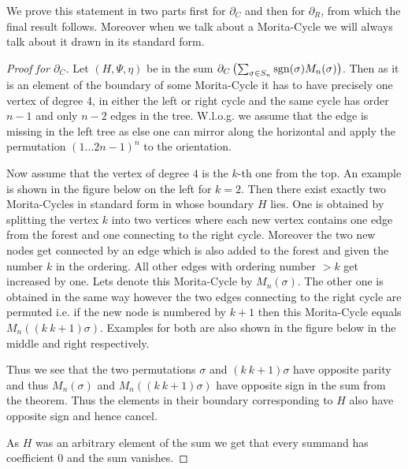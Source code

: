 We prove this statement in two parts first for $\partial_{C}$ and then for $\partial_{R}$, from which the final result follows.
Moreover when we talk about a Morita-Cycle we will always talk about it drawn in its standard form.
\begin{proof}[Proof for $\partial_C$]
	Let $(H,\Psi,\eta)$ be in the sum $\partial_{C}\left(\sum_{\sigma \in S_{n}} \operatorname{sgn}(\sigma) M_{n}(\sigma)\right)$.
	Then as it is an element of the boundary of some Morita-Cycle it has to
	have precisely one vertex of degree 4, in either the left or right cycle and the same cycle has order $n-1$ and only $n-2$ edges in the tree.
	W.l.o.g. we assume that the edge is missing in the left tree as else one can mirror along the horizontal
	and apply the permutation $(1 \ldots 2n-1)^{n}$ to the orientation.

	Now assume that the vertex of degree $4$ is the $k$-th one from the top. An example is shown in the figure below on the left for $k = 2$.
	Then there exist exactly two Morita-Cycles in standard form in whose boundary $H$ lies. 
	One is obtained by splitting the vertex $k$ into two vertices where each new vertex contains one edge from the forest and one connecting to the right cycle.
	Moreover the two new nodes get connected by an edge which is also added to the forest and given the number $k$ in the ordering.
	All other edges with ordering number  $> k $ get increased by one. Lets denote this Morita-Cycle by $M_{n}(\sigma)$.
	The other one is obtained in the same way however the two edges connecting to the right cycle are permuted i.e.
	if the new node is numbered by $k+1$ then this Morita-Cycle equals $M_{n}((k\ k+1)\sigma)$.
	Examples for both are also shown in the figure below in the middle and right respectively.

	Thus we see that the two permutations $\sigma$ and $(k\ k+1) \sigma$ have opposite parity and thus $M_{n}(\sigma)$ and $M_{n}((k\ k+1) \sigma)$ have
	opposite sign in the sum from the theorem. Thus the elements in their boundary corresponding to $H$ also have opposite sign and hence cancel.

	As $H$ was an arbitrary element of the sum we get that every summand has coefficient $0$ and the sum vanishes.
\end{proof}

